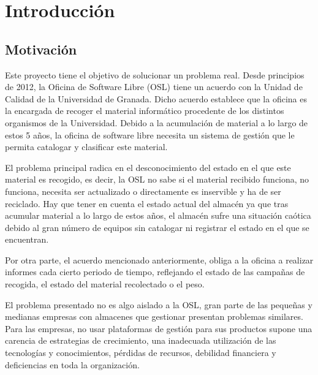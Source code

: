 \documentclass[a4paper,11pt]{book}
\begin{document}


\tableofcontents
\listoffigures
\listoftables

%

%


\chapter{Introducción}


\section{Motivación}

Este proyecto tiene el objetivo de solucionar un problema real. Desde principios de 2012, la Oficina de Software Libre (OSL) tiene un acuerdo con la Unidad de Calidad de la Universidad de Granada. Dicho acuerdo establece que la oficina es la encargada de recoger el material  informático procedente de los distintos organismos de la Universidad. Debido a la acumulación de material a lo largo de estos 5 años, la oficina de software libre necesita un sistema de gestión que le permita catalogar y clasificar este material.
  
El problema principal radica en el desconocimiento del estado en el que este material es recogido, es decir, la OSL no sabe si el material recibido funciona, no funciona, necesita ser actualizado o directamente es inservible y ha de ser reciclado. Hay que tener en cuenta el estado actual del almacén ya que tras acumular material a lo largo de estos años, el almacén sufre una situación caótica debido al gran número de equipos sin catalogar ni registrar el estado en el que se encuentran. 

Por otra parte, el acuerdo mencionado anteriormente, obliga a la oficina a realizar informes cada cierto periodo de tiempo, reflejando el estado de las campañas de recogida, el estado del material recolectado o el peso.
  
El problema presentado no es algo aislado a la OSL, gran parte de las pequeñas y medianas empresas con almacenes que gestionar presentan problemas similares. Para las  empresas, no usar plataformas de gestión para sus productos supone una carencia de estrategias de crecimiento, una inadecuada utilización de las tecnologías y conocimientos, pérdidas de recursos, debilidad financiera y deficiencias en toda la organización. 
\end{document}
